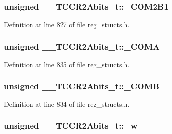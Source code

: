 \hypertarget{union_____t_c_c_r2_abits__t_a447a54e396b31ef549d61fa455fa5f27}{
\subsubsection[{\+\_\+\+C\+O\+M2\+B1}]{\setlength{\rightskip}{0pt plus 5cm}unsigned \+\_\+\+\_\+\+T\+C\+C\+R2\+Abits\+\_\+t\+::\+\_\+\+C\+O\+M2\+B1}}\label{union_____t_c_c_r2_abits__t_a447a54e396b31ef549d61fa455fa5f27}


Definition at line 827 of file reg\+\_\+structs.\+h.

\hypertarget{union_____t_c_c_r2_abits__t_abe4bbf00c5f9be6c72676841a7561886}{
\subsubsection[{\+\_\+\+C\+O\+M\+A}]{\setlength{\rightskip}{0pt plus 5cm}unsigned \+\_\+\+\_\+\+T\+C\+C\+R2\+Abits\+\_\+t\+::\+\_\+\+C\+O\+M\+A}}\label{union_____t_c_c_r2_abits__t_abe4bbf00c5f9be6c72676841a7561886}


Definition at line 835 of file reg\+\_\+structs.\+h.

\hypertarget{union_____t_c_c_r2_abits__t_add7f138674f8aa786f819b57210ae40f}{
\subsubsection[{\+\_\+\+C\+O\+M\+B}]{\setlength{\rightskip}{0pt plus 5cm}unsigned \+\_\+\+\_\+\+T\+C\+C\+R2\+Abits\+\_\+t\+::\+\_\+\+C\+O\+M\+B}}\label{union_____t_c_c_r2_abits__t_add7f138674f8aa786f819b57210ae40f}


Definition at line 834 of file reg\+\_\+structs.\+h.

\hypertarget{union_____t_c_c_r2_abits__t_a1b770b0c1428ed5fd5fe787110313a0f}{
\subsubsection[{\+\_\+w}]{\setlength{\rightskip}{0pt plus 5cm}unsigned \+\_\+\+\_\+\+T\+C\+C\+R2\+Abits\+\_\+t\+::\+\_\+w}}\label{union_____t_c_c_r2_abits__t_a1b770b0c1428ed5fd5fe787110313a0f}


